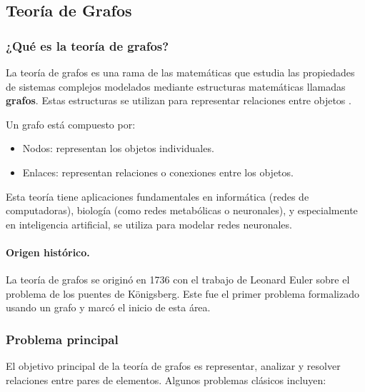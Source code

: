 \subsection{Teoría de Grafos}

\subsubsection{¿Qué es la teoría de grafos?}

La teoría de grafos es una rama de las matemáticas que estudia las propiedades de sistemas complejos modelados mediante estructuras matemáticas llamadas \textbf{grafos}. Estas estructuras se utilizan para representar relaciones entre objetos \citep{bollobas1998modern}. 

Un grafo está compuesto por:

\begin{itemize}
    \item Nodos: representan los objetos individuales.
    \item Enlaces: representan relaciones o conexiones entre los objetos.
\end{itemize}

Esta teoría tiene aplicaciones fundamentales en informática (redes de computadoras), biología (como redes metabólicas o neuronales), y especialmente en inteligencia artificial, se utiliza para modelar redes neuronales.

\paragraph{Origen histórico.}  
La teoría de grafos se originó en 1736 con el trabajo de Leonard Euler sobre el problema de los puentes de Königsberg. Este fue el primer problema formalizado usando un grafo y marcó el inicio de esta área.

\subsubsection{Problema principal}

El objetivo principal de la teoría de grafos es representar, analizar y resolver relaciones entre pares de elementos. Algunos problemas clásicos incluyen:


